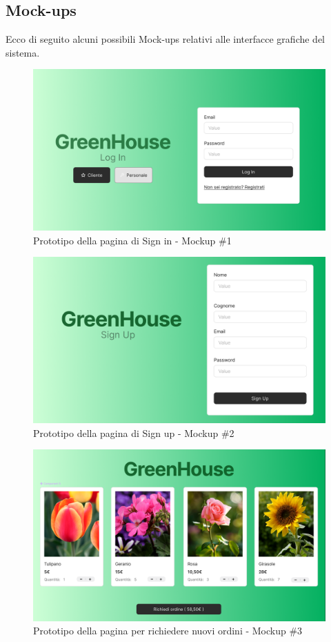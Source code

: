 \documentclass{article}
\begin{document}
\subsection{Mock-ups}
Ecco di seguito alcuni possibili Mock-ups relativi alle interfacce grafiche del sistema.
\begin{figure}[H]
    \centering
    \includegraphics[scale=0.37]{resources/images/Mockups/mockup_1.png}
    \caption{Prototipo della pagina di Sign in - Mockup \#1}
    \label{fig:mockup_1}
\end{figure}
\begin{figure}[H]
    \centering
    \includegraphics[scale=0.35]{resources/images/Mockups/mockup_2.png}
    \caption{Prototipo della pagina di Sign up - Mockup \#2}
    \label{fig:mockup_2}
\end{figure}
\begin{figure}[H]
    \centering
    \includegraphics[scale=0.35]{resources/images/Mockups/mockup_3.png}
    \caption{Prototipo della pagina per richiedere nuovi ordini - Mockup \#3}
    \label{fig:mockup_3}
\end{figure}
\end{document}
